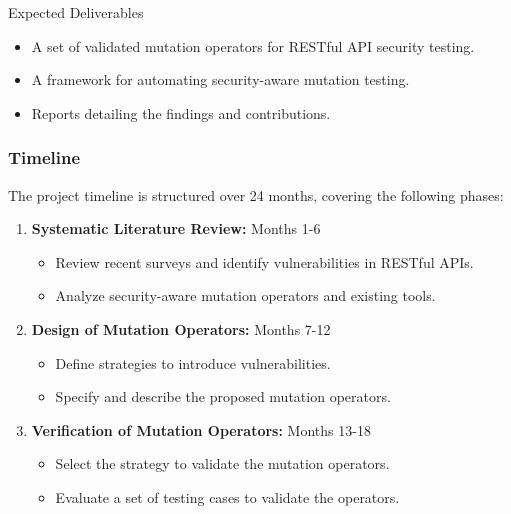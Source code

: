 \documentclass[12pt]{beamer}
\theoremstyle{remark}
\theoremstyle{definition}
\begin{document}
\begin{frame}[allowframebreaks]
\begin{block}{Expected Deliverables}
\begin{itemize}
    \item A set of validated mutation operators for RESTful API security testing.
    \item A framework for automating security-aware mutation testing.
    \item Reports detailing the findings and contributions.
\end{itemize}
\end{block}
\end{frame}


\begin{frame}[allowframebreaks]
\frametitle{Timeline}
The project timeline is structured over 24 months, covering the following phases:

\begin{enumerate}
    \item \textbf{Systematic Literature Review:} Months 1-6
    \begin{itemize}
        \item Review recent surveys and identify vulnerabilities in RESTful APIs.
        \item Analyze security-aware mutation operators and existing tools.
    \end{itemize}

    \item \textbf{Design of Mutation Operators:} Months 7-12
    \begin{itemize}
        \item Define strategies to introduce vulnerabilities.
        \item Specify and describe the proposed mutation operators.
    \end{itemize}

    \item \textbf{Verification of Mutation Operators:} Months 13-18
    \begin{itemize}
      \item Select the strategy to validate the mutation operators.
      \item Evaluate a set of testing cases to validate the operators.
    \end{itemize}


\end{enumerate}
\end{frame}
\end{document}
